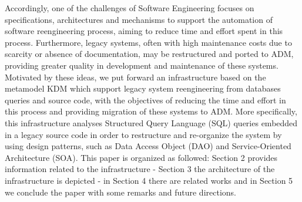 Accordingly, one of the challenges of Software Engineering focuses on specifications, architectures and mechanisms to support the automation of software reengineering process, aiming to reduce time and effort spent in this process. Furthermore, legacy systems, often with high maintenance costs due to scarcity or absence of documentation, may be restructured and ported to ADM, providing greater quality in development and maintenance of these systems. Motivated by these ideas, we put forward an infrastructure based on the metamodel KDM which support legacy system reengineering from databases queries and source code, with the objectives of reducing the time and effort in this process and providing migration of these systems to ADM. More specifically, this infrastructure analyses Structured Query Language (SQL) queries embedded in a legacy source code in order to restructure and re-organize the system by using design patterns, such as Data Access Object (DAO) and Service-Oriented Architecture (SOA).  This paper is organized as followed: Section 2 provides information related to the infrastructure - Section 3 the architecture of the infrastructure is depicted - in Section 4 there are related works and in Section 5 we conclude the paper with some remarks and future directions.